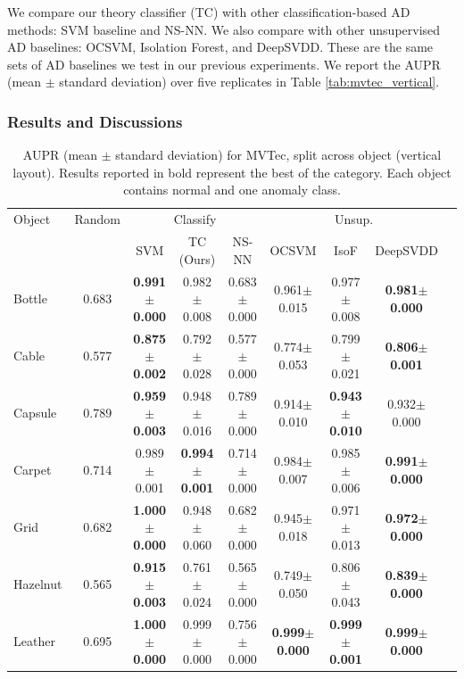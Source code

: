 \documentclass{article}
\begin{document}
We compare our theory classifier (TC) with other classification-based
AD methods: SVM baseline and NS-NN. We also compare with other unsupervised AD baselines: OCSVM, Isolation Forest, and DeepSVDD. These are the same sets of AD baselines we test in our previous experiments. We report the AUPR (mean $\pm$ standard deviation) over five replicates in Table \ref{tab:mvtec_vertical}.


\subsubsection{Results and Discussions}

\begin{table}[t]
    \centering
    \caption{AUPR (mean $\pm$ standard deviation) for MVTec, split across object (vertical layout). Results reported in bold represent the best of the category. Each object contains normal and one anomaly class. }
    \begin{adjustbox}{max width=\textwidth}
    \begin{tabular}{lcccccccc}
        \toprule
        Object & Random & \multicolumn{3}{c}{Classify} & \multicolumn{3}{c}{Unsup.} \\
        \cmidrule(lr){3-5} \cmidrule(lr){6-8}
        &  & SVM & TC (Ours) & NS-NN & OCSVM & IsoF & DeepSVDD \\
        \midrule
        Bottle & 0.683 & \bf{0.991$\pm$0.000} & 0.982$\pm$0.008 & 0.683$\pm$0.000 & 0.961$\pm$0.015 & 0.977$\pm$0.008 & \bf{0.981$\pm$0.000} \\
        Cable & 0.577 & \bf{0.875$\pm$0.002} & 0.792$\pm$0.028 & 0.577$\pm$0.000 & 0.774$\pm$0.053 & 0.799$\pm$0.021 & \bf{0.806$\pm$0.001} \\
        Capsule & 0.789 & \bf{0.959$\pm$0.003} & 0.948$\pm$0.016 & 0.789$\pm$0.000 & 0.914$\pm$0.010 & \bf{0.943$\pm$0.010} & 0.932$\pm$0.000 \\
        Carpet & 0.714 & 0.989$\pm$0.001 & \bf{0.994$\pm$0.001} & 0.714$\pm$0.000 & 0.984$\pm$0.007 & 0.985$\pm$0.006 & \bf{0.991$\pm$0.000} \\
        Grid & 0.682 & \bf{1.000$\pm$0.000} & 0.948$\pm$0.060 & 0.682$\pm$0.000 & 0.945$\pm$0.018 & 0.971$\pm$0.013 & \bf{0.972$\pm$0.000} \\
        Hazelnut & 0.565 & \bf{0.915$\pm$0.003} & 0.761$\pm$0.024 & 0.565$\pm$0.000 & 0.749$\pm$0.050 & 0.806$\pm$0.043 & \bf{0.839$\pm$0.000} \\
        Leather & 0.695 & \bf{1.000$\pm$0.000} & 0.999$\pm$0.000 & 0.756$\pm$0.000 & \bf{0.999$\pm$0.000} & \bf{0.999$\pm$0.001} & \bf{0.999$\pm$0.000} \\

\end{tabular}
\end{adjustbox}
\end{table}
\end{document}
